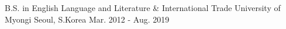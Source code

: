 

\begin{cventries}

  \cventry
    {B.S. in English Language and Literature \& International Trade} %
    {University of Myongi} %
    {Seoul, S.Korea} %
    {Mar. 2012 - Aug. 2019} %
    {
    }

\end{cventries}
